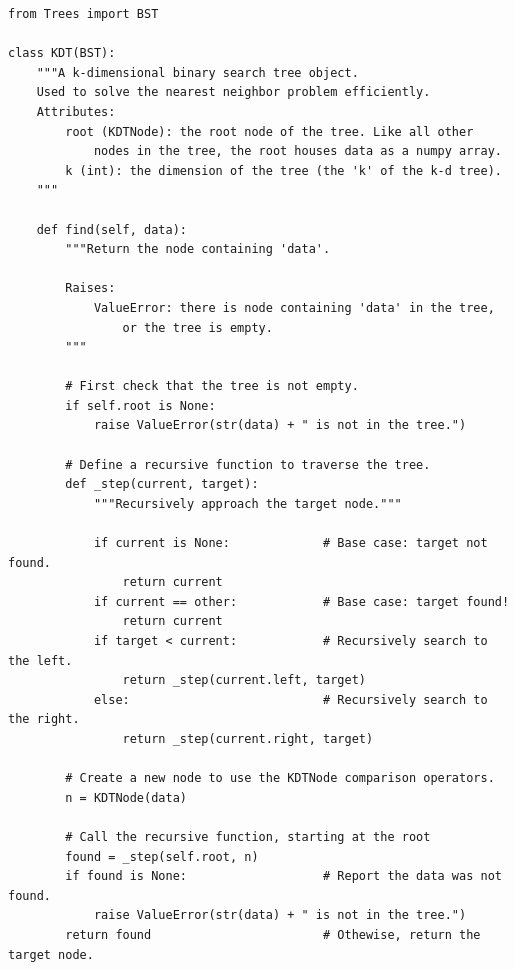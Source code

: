\begin{lstlisting}
from Trees import BST

class KDT(BST):
    """A k-dimensional binary search tree object.
    Used to solve the nearest neighbor problem efficiently.
    Attributes:
        root (KDTNode): the root node of the tree. Like all other
            nodes in the tree, the root houses data as a numpy array.
        k (int): the dimension of the tree (the 'k' of the k-d tree).
    """

	def find(self, data):
        """Return the node containing 'data'.
        
        Raises:
            ValueError: there is node containing 'data' in the tree,
                or the tree is empty.
        """

        # First check that the tree is not empty.
        if self.root is None:
            raise ValueError(str(data) + " is not in the tree.")
		
        # Define a recursive function to traverse the tree.
        def _step(current, target):
            """Recursively approach the target node."""
            
            if current is None:             # Base case: target not found.
                return current
            if current == other:            # Base case: target found!
                return current
            if target < current:            # Recursively search to the left.
                return _step(current.left, target)
            else:                           # Recursively search to the right.
                return _step(current.right, target)
        
        # Create a new node to use the KDTNode comparison operators.
        n = KDTNode(data)

        # Call the recursive function, starting at the root
        found = _step(self.root, n)
        if found is None:                   # Report the data was not found.
            raise ValueError(str(data) + " is not in the tree.")
        return found                        # Othewise, return the target node.
\end{lstlisting}

